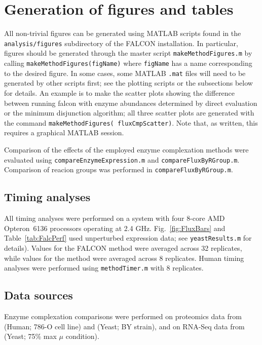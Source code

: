 \section{Generation of figures and tables}

All non-trivial figures can be generated using MATLAB scripts found in
the \texttt{analysis/figures} subdirectory of the FALCON installation.
In particular, figures should be generated through the master script
\texttt{makeMethodFigures.m} by calling
\texttt{makeMethodFigures(figName)} where \texttt{figName} has a name
corresponding to the desired figure.  In some cases, some MATLAB
\texttt{.mat} files will need to be generated by other scripts first;
see the plotting scripts or the subsections below for details. An
example is to make the scatter plots showing the difference between
running falcon with enzyme abundances determined by direct evaluation
or the minimum disjunction algorithm; all three scatter plots are
generated with the command \texttt{makeMethodFigures(\textquotesingle
fluxCmpScatter\textquotesingle)}. Note that, as written, this requires
a graphical MATLAB session.

\begin{sloppypar}
Comparison of the effects of the employed enzyme complexation methods
were evaluated using \texttt{compareEnzymeExpression.m} and 
\texttt{compareFluxByRGroup.m}. Comparison of reacion groups was
performed in \texttt{compareFluxByRGroup.m}.
\end{sloppypar}

\subsection{Timing analyses}
All timing analyses were performed on a system with four 8-core AMD
Opteron\texttrademark\ 6136 processors operating at 2.4 GHz. 
Fig.~\ref{fig:FluxBars} and Table~\ref{tab:FalcPerf} used unperturbed
expression data; see
\texttt{yeastResults.m} for details). Values for the FALCON method
were averaged across 32 replicates, while values for the
\citealt{Lee2012} method were averaged across 8 replicates. Human
timing analyses were performed using \texttt{methodTimer.m} with
8 replicates.

\subsection{Data sources}
Enzyme complexation comparisons were performed on proteomics data
from \citealt{Gholami2013} (Human; 786-O cell line) and 
\citealt{Picotti2013} (Yeast; BY strain), and on RNA-Seq data
from \citealt{Lee2012} (Yeast; 75\% max $\mu$ condition).
